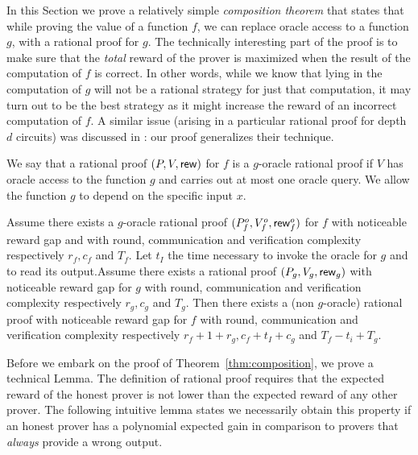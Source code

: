 In this Section we prove a relatively simple {\em composition theorem} that states that while proving the value of a function $f$, we can replace oracle access to a function $g$, with a rational proof for $g$. The technically interesting part of the proof is to make sure that the {\em total} reward of the prover is maximized when the result of the computation of $f$ is correct. In other words, while we know that lying in the computation of $g$ will not be a rational strategy for just that computation, it may turn out to be the best strategy as it might increase the reward of an incorrect computation of $f$. A similar issue (arising in a particular rational proof for depth $d$ circuits) was discussed in \cite{am1}: our proof generalizes their technique. 


\begin{definition}
	\label{def:oracle-RP}
	We say that a rational proof $(P,V, \mathsf{rew})$ for $f$ is a $g$-oracle rational proof if $V$ has oracle access to the function $g$ and carries out at most one oracle query.
	We allow the function $g$ to depend on the specific input $x$.
\end{definition}



\newcommand{\rewf}{\rew^o_f}
\newcommand{\rewg}{\rew_g}
\begin{theorem}
	\label{thm:composition}
	Assume there exists a $g$-oracle rational proof $(P^o_f, V^o_f, \rewf)$ for $f$ with noticeable reward gap  and with round, communication and verification complexity respectively $r_f, c_f$ and $T_f$. Let $t_I$ the time necessary to invoke the oracle for $g$ and to read its output.Assume there exists a rational proof $(P_g, V_g, \rewg)$ with noticeable reward gap for $g$ with round, communication and verification complexity respectively $r_g, c_g$ and $T_g$. Then there exists a (non $g$-oracle) rational proof with noticeable reward gap for $f$ with round, communication and verification complexity respectively $r_f + 1 + r_g , c_f + t_I + c_g$ and $T_f - t_i + T_g$.
\end{theorem}

Before we embark on the proof of Theorem~\ref{thm:composition}, we prove a 
technical Lemma. 
The definition of rational proof requires that the expected reward of the honest prover is not lower than the expected reward of any other prover.
The following intuitive lemma states we necessarily obtain this property if an honest prover has a polynomial expected gain in comparison to provers
that \textit{always} provide a wrong output.

